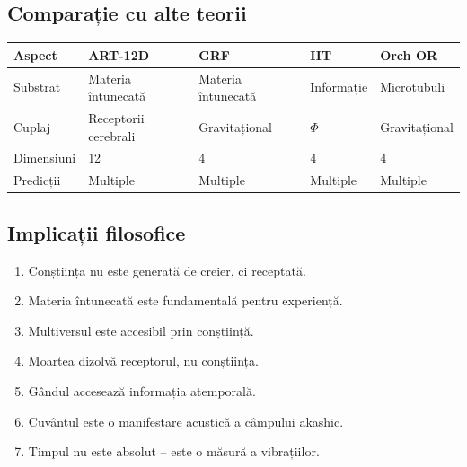 \documentclass[11pt,a4paper]{article}
\begin{document}
\subsection{Comparație cu alte teorii}
\begin{table}[H]
\centering
\begin{tabular}{@{}lllll@{}}
\toprule
\textbf{Aspect} & \textbf{ART-12D} & \textbf{GRF} & \textbf{IIT} & \textbf{Orch OR} \\ \midrule
Substrat & Materia întunecată & Materia întunecată & Informație & Microtubuli \\
Cuplaj & Receptorii cerebrali & Gravitațional & $\Phi$ & Gravitațional \\
Dimensiuni & 12 & 4 & 4 & 4 \\
Predicții & Multiple & Multiple & Multiple & Multiple \\ \bottomrule
\end{tabular}
\end{table}

\subsection{Implicații filosofice}
\begin{enumerate}
    \item Conștiința nu este generată de creier, ci receptată.
    \item Materia întunecată este fundamentală pentru experiență.
    \item Multiversul este accesibil prin conștiință.
    \item Moartea dizolvă receptorul, nu conștiința.
    \item Gândul accesează informația atemporală.
    \item Cuvântul este o manifestare acustică a câmpului akashic.
    \item Timpul nu este absolut – este o măsură a vibrațiilor.
\end{enumerate}
\end{document}
